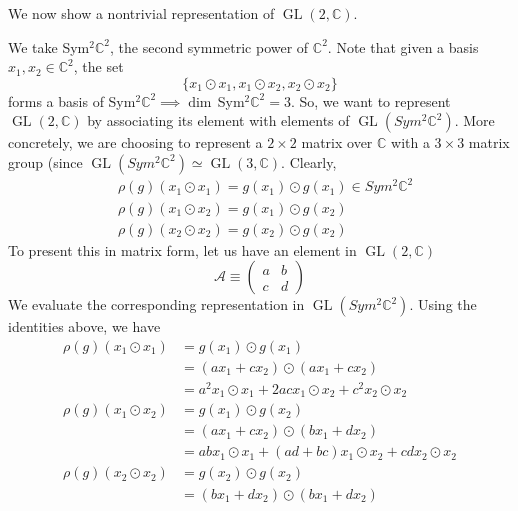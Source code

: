 \documentclass{article}
\DeclareMathOperator{\GL}{GL}
\begin{document}
  We now show a nontrivial representation of $\GL(2, \mathbb{C})$. 

  \begin{example}
    We take Sym$^2 \mathbb{C}^2$, the second symmetric power of $\mathbb{C}^2$. Note that given a basis $x_1, x_2 \in \mathbb{C}^2$, the set
    \begin{equation}
      \{x_1 \odot x_1, x_1 \odot x_2, x_2 \odot x_2\}
    \end{equation}
    forms a basis of Sym$^2 \mathbb{C}^2 \implies \dim\,$Sym$^2 \mathbb{C}^2 = 3$. So, we want to represent $\GL(2, \mathbb{C})$ by associating its element with elements of $\GL(Sym^2 \mathbb{C}^2)$. More concretely, we are choosing to represent a $2 \times 2$ matrix over $\mathbb{C}$ with a $3 \times 3$ matrix group (since $\GL(Sym^2 \mathbb{C}^2) \simeq \GL(3, \mathbb{C})$. Clearly,
    \begin{align*}
      & \rho(g) (x_1 \odot x_1) = g(x_1) \odot g(x_1) \in Sym^2 \mathbb{C}^2 \\
      & \rho(g) (x_1 \odot x_2) = g(x_1) \odot g(x_2) \\
      & \rho(g) (x_2 \odot x_2) = g(x_2) \odot g(x_2)
    \end{align*}
    To present this in matrix form, let us have an element in $\GL (2, \mathbb{C})$
    \begin{equation}
      \mathcal{A} \equiv \begin{pmatrix}
      a & b \\
      c & d
      \end{pmatrix}
    \end{equation}
    We evaluate the corresponding representation in $\GL( Sym^2 \mathbb{C}^2)$. Using the identities above, we have 
    \begin{align*}
      \rho(g) (x_1 \odot x_1) & = g(x_1) \odot g(x_1) \\
      & = (a x_1 + c x_2) \odot (a x_1 + c x_2) \\
      & = a^2 x_1 \odot x_1 + 2ac x_1 \odot x_2 + c^2 x_2 \odot x_2 \\
      \rho(g) (x_1 \odot x_2) & = g(x_1) \odot g(x_2) \\
      & = (a x_1 + c x_2) \odot (b x_1 + d x_2) \\
      & = ab x_1 \odot x_1 + (ad + bc) x_1 \odot x_2 + cd x_2 \odot x_2 \\
      \rho(g) (x_2 \odot x_2) & = g(x_2) \odot g(x_2) \\
      & = (b x_1 + d x_2) \odot (b x_1 + d x_2) \\

\end{align*}
\end{example}
\end{document}
